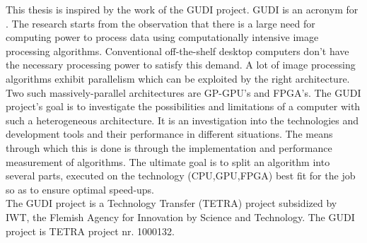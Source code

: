 This thesis is inspired by the work of the GUDI project. GUDI is an acronym for . The research starts from the observation that there is a large need for computing power to process data using computationally intensive image processing algorithms. Conventional off-the-shelf desktop computers don't have the necessary processing power to satisfy this demand. A lot of image processing algorithms exhibit parallelism which can be exploited by the right architecture. Two such massively-parallel architectures are GP-GPU's and FPGA's. The GUDI project's goal is to investigate the possibilities and limitations of a computer with such a heterogeneous architecture. It is an investigation into the technologies and development tools and their performance in different situations. The means through which this is done is through the implementation and performance measurement of algorithms. The ultimate goal is to split an algorithm into several parts, executed on the technology (CPU,GPU,FPGA) best fit for the job so as to ensure optimal speed-ups.\\
The GUDI project is a Technology Transfer (TETRA) project subsidized by IWT, the Flemish Agency for Innovation by Science and Technology. The GUDI project is TETRA project nr. 1000132\cite{gudisite}.






